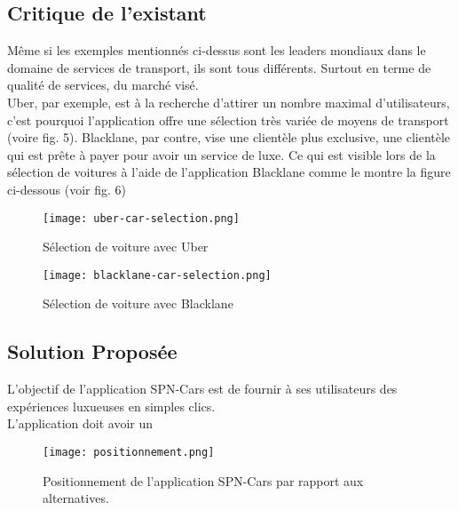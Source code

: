 \subsection{Critique de l'existant}
Même si les exemples mentionnés ci-dessus sont les leaders mondiaux dans le domaine de services de transport, ils sont tous différents. Surtout en terme de qualité de services, du marché visé.\\
\noindent Uber, par exemple, est à la recherche d'attirer un nombre maximal d'utilisateurs, c'est pourquoi l'application offre une sélection très variée de moyens de transport (voire fig. 5). Blacklane, par contre, vise une clientèle plus exclusive, une clientèle qui est prête à payer pour avoir un service de luxe. Ce qui est visible lors de la sélection de voitures à l'aide de l'application Blacklane comme le montre la figure ci-dessous (voir fig. 6)
\vspace{1cm}
\clearpage
\begin{multicols}{2}
    \begin{figure}[H]
        \centering
        \texttt{[image: uber-car-selection.png]}
        \vspace{1cm}
        \captionsetup{justification=centering}
        \caption{Sélection de voiture avec Uber}
        \label{fig:uber_selection}
    \end{figure}
    \begin{figure}[H]
        \centering
        \texttt{[image: blacklane-car-selection.png]}
        \vspace{1cm}
        \captionsetup{justification=centering}
        \caption{Sélection de voiture avec Blacklane}
        \label{fig:blacklane_selection}
    \end{figure}
\end{multicols}
\subsection{Solution Proposée}
L'objectif de l'application SPN-Cars est de fournir à ses utilisateurs des expériences luxueuses en simples clics.\\
L'application doit avoir un
\begin{figure}[H]
    \centering
    \texttt{[image: positionnement.png]}
    \vspace{1cm}
    \caption{Positionnement de l'application SPN-Cars par rapport aux alternatives.}
    \label{fig:positionnement_marcha}
\end{figure}
